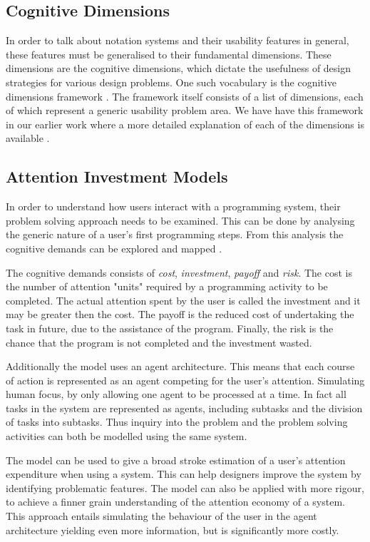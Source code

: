 \subsection{Cognitive Dimensions} \label{sec:cog-dim}
In order to talk about notation systems and their usability features in general, these features must be generalised to their fundamental dimensions. These dimensions are the cognitive dimensions, which dictate the usefulness of design strategies for various design problems. One such vocabulary is the cognitive dimensions framework \cite{green1996usability}. The framework itself consists of a list of dimensions, each of which represent a generic usability problem area.
We have have this framework in our earlier work where a more detailed explanation of each of the dimensions is available \cite{p92018gameplay}.

\subsection{Attention Investment Models} \label{sec:attention-investment}
In order to understand how users interact with a programming system, their problem solving approach needs to be examined. This can be done by analysing the generic nature of a user's first programming steps. From this analysis the cognitive demands can be explored and mapped \cite{blackwell2002first}.

The cognitive demands consists of \textit{cost}, \textit{investment}, \textit{payoff} and \textit{risk}. The cost is the number of attention "units" required by a programming activity to be completed. The actual attention spent by the user is called the investment and it may be greater then the cost. The payoff is the reduced cost of undertaking the task in future, due to the assistance of the program. Finally, the risk is the chance that the program is not completed and the investment wasted.

Additionally the model uses an agent architecture. This means that each course of action is represented as an agent competing for the user's attention. Simulating human focus, by only allowing one agent to be processed at a time. In fact all tasks in the system are represented as agents, including subtasks and the division of tasks into subtasks. Thus inquiry into the problem and the problem solving activities can both be modelled using the same system.

The model can be used to give a broad stroke estimation of a user's attention expenditure when using a system. This can help designers improve the system by identifying problematic features. The model can also be applied with more rigour, to achieve a finner grain understanding of the attention economy of a system. This approach entails simulating the behaviour of the user in the agent architecture yielding even more information, but is significantly more costly.

